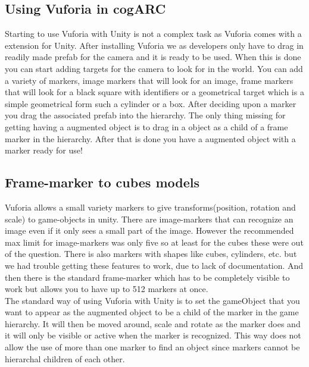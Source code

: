 

\subsection{Using Vuforia in cogARC}
\label{subsec:usingVuforiaincogARC}
Starting to use Vuforia with Unity is not a complex task as Vuforia comes with a extension for Unity.
After installing Vuforia we as developers only have to drag in readily made \gls{prefab} for the camera and it is ready to be used.
When this is done you can start adding targets for the camera to look for in the world.
You can add a variety of markers, image markers that will look for an image, frame markers that will look for a black square with identifiers or a geometrical target which is a simple geometrical form such a cylinder or a box.
After deciding upon a marker you drag the associated prefab into the hierarchy.
The only thing missing for getting having a augmented object is to drag in a object as a child of a frame marker in the hierarchy.
After that is done you have a augmented object with a marker ready for use!

\subsection{Frame-marker to cubes models}
\label{subsec:framemarker_model} 
Vuforia allows a small variety markers to give transforms(position, rotation and scale) to game-objects in unity. 
There are image-markers that can recognize an image even if it only sees a small part of the image. 
However the recommended max limit for image-markers was only five so at least for the cubes these were out of the question. 
There is also markers with shapes like cubes, cylinders, etc. but we had trouble getting these features to work, due to lack of documentation. 
And then there is the standard frame-marker which has to be completely visible to work but allows you to have up to 512 markers at once.\\
The standard way of using Vuforia with Unity is to set the gameObject that you want to appear as the augmented object to be a child of the marker in the game hierarchy. 
It will then be moved around, scale and rotate as the marker does and it will only be visible or active when the marker is recognized. 
This way does not allow the use of more than one marker to find an object since markers cannot be hierarchal children of each other. 

